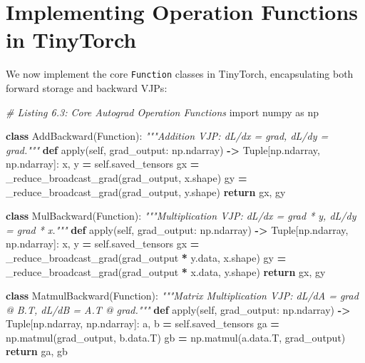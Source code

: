 \documentclass[
  letterpaper,
]{scrbook}
\newenvironment{Shaded}{\begin{snugshade}}{\end{snugshade}}
\newcommand{\BuiltInTok}[1]{#1}
\newcommand{\CommentTok}[1]{\textcolor[rgb]{0.56,0.35,0.01}{\textit{#1}}}
\newcommand{\ControlFlowTok}[1]{\textcolor[rgb]{0.13,0.29,0.53}{\textbf{#1}}}
\newcommand{\ImportTok}[1]{#1}
\newcommand{\KeywordTok}[1]{\textcolor[rgb]{0.13,0.29,0.53}{\textbf{#1}}}
\newcommand{\NormalTok}[1]{#1}
\newcommand{\OperatorTok}[1]{\textcolor[rgb]{0.81,0.36,0.00}{\textbf{#1}}}
\newcommand{\VariableTok}[1]{\textcolor[rgb]{0.00,0.00,0.00}{#1}}
\begin{document}
\section{Implementing Operation Functions in
TinyTorch}\label{implementing-operation-functions-in-tinytorch}

We now implement the core \texttt{Function} classes in TinyTorch,
encapsulating both forward storage and backward VJPs:

\begin{Shaded}
\begin{Highlighting}[]
\CommentTok{\# Listing 6.3: Core Autograd Operation Functions}
\ImportTok{import}\NormalTok{ numpy }\ImportTok{as}\NormalTok{ np}

\KeywordTok{class}\NormalTok{ AddBackward(Function):}
    \CommentTok{"""Addition VJP: dL/dx = grad, dL/dy = grad."""}
    \KeywordTok{def} \BuiltInTok{apply}\NormalTok{(}\VariableTok{self}\NormalTok{, grad\_output: np.ndarray) }\OperatorTok{{-}\textgreater{}}\NormalTok{ Tuple[np.ndarray, np.ndarray]:}
\NormalTok{        x, y }\OperatorTok{=} \VariableTok{self}\NormalTok{.saved\_tensors}
\NormalTok{        gx }\OperatorTok{=}\NormalTok{ \_reduce\_broadcast\_grad(grad\_output, x.shape)}
\NormalTok{        gy }\OperatorTok{=}\NormalTok{ \_reduce\_broadcast\_grad(grad\_output, y.shape)}
        \ControlFlowTok{return}\NormalTok{ gx, gy}

\KeywordTok{class}\NormalTok{ MulBackward(Function):}
    \CommentTok{"""Multiplication VJP: dL/dx = grad * y, dL/dy = grad * x."""}
    \KeywordTok{def} \BuiltInTok{apply}\NormalTok{(}\VariableTok{self}\NormalTok{, grad\_output: np.ndarray) }\OperatorTok{{-}\textgreater{}}\NormalTok{ Tuple[np.ndarray, np.ndarray]:}
\NormalTok{        x, y }\OperatorTok{=} \VariableTok{self}\NormalTok{.saved\_tensors}
\NormalTok{        gx }\OperatorTok{=}\NormalTok{ \_reduce\_broadcast\_grad(grad\_output }\OperatorTok{*}\NormalTok{ y.data, x.shape)}
\NormalTok{        gy }\OperatorTok{=}\NormalTok{ \_reduce\_broadcast\_grad(grad\_output }\OperatorTok{*}\NormalTok{ x.data, y.shape)}
        \ControlFlowTok{return}\NormalTok{ gx, gy}

\KeywordTok{class}\NormalTok{ MatmulBackward(Function):}
    \CommentTok{"""Matrix Multiplication VJP: dL/dA = grad @ B.T, dL/dB = A.T @ grad."""}
    \KeywordTok{def} \BuiltInTok{apply}\NormalTok{(}\VariableTok{self}\NormalTok{, grad\_output: np.ndarray) }\OperatorTok{{-}\textgreater{}}\NormalTok{ Tuple[np.ndarray, np.ndarray]:}
\NormalTok{        a, b }\OperatorTok{=} \VariableTok{self}\NormalTok{.saved\_tensors}
\NormalTok{        ga }\OperatorTok{=}\NormalTok{ np.matmul(grad\_output, b.data.T)}
\NormalTok{        gb }\OperatorTok{=}\NormalTok{ np.matmul(a.data.T, grad\_output)}
        \ControlFlowTok{return}\NormalTok{ ga, gb}


\end{Highlighting}
\end{Shaded}
\end{document}
